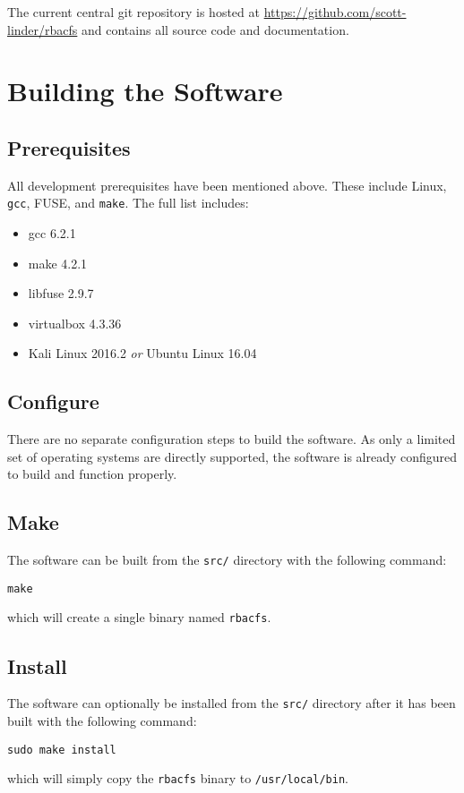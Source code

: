 \documentclass[11pt,oneside,letterpaper]{article}
\begin{document}
The current central git repository is hosted at
\url{https://github.com/scott-linder/rbacfs} and contains all source code and
documentation.

\section{Building the Software}
\label{sec:build}

\subsection{Prerequisites}

All development prerequisites have been mentioned above. These include
Linux, {\tt gcc}, FUSE, and {\tt make}. The full list includes:

\begin{itemize}
    \item gcc 6.2.1
    \item make 4.2.1
    \item libfuse 2.9.7
    \item virtualbox 4.3.36
    \item Kali Linux 2016.2 {\it or} Ubuntu Linux 16.04
\end{itemize}

\subsection{Configure}

There are no separate configuration steps to build the software. As only a
limited set of operating systems are directly supported, the software is
already configured to build and function properly.

\subsection{Make}

The software can be built from the {\tt src/} directory with the following
command:
\begin{lstlisting}
make
\end{lstlisting}
which will create a single binary named {\tt rbacfs}.

\subsection{Install}

The software can optionally be installed from the {\tt src/} directory after it
has been built with the following command:
\begin{lstlisting}
sudo make install
\end{lstlisting}
which will simply copy the {\tt rbacfs} binary to {\tt /usr/local/bin}.
\end{document}
